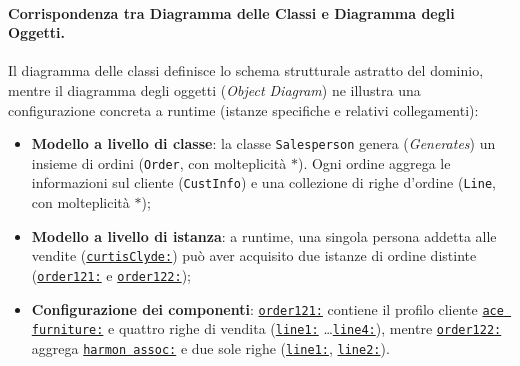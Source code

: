 \documentclass[12pt]{extarticle}
\begin{document}
\paragraph{Corrispondenza tra Diagramma delle Classi e Diagramma degli Oggetti.}
Il diagramma delle classi definisce lo schema strutturale astratto del dominio, mentre il diagramma degli oggetti (\textit{Object Diagram}) ne illustra una configurazione concreta a runtime (istanze specifiche e relativi collegamenti):
\begin{itemize}
    \item \textbf{Modello a livello di classe}: la classe \texttt{Salesperson} genera (\textit{Generates}) un insieme di ordini (\texttt{Order}, con molteplicità $*$). Ogni ordine aggrega le informazioni sul cliente (\texttt{CustInfo}) e una collezione di righe d'ordine (\texttt{Line}, con molteplicità $*$);
    \item \textbf{Modello a livello di istanza}: a runtime, una singola persona addetta alle vendite (\texttt{\underline{curtisClyde:}}) può aver acquisito due istanze di ordine distinte (\texttt{\underline{order121:}} e \texttt{\underline{order122:}});
    \item \textbf{Configurazione dei componenti}: \texttt{\underline{order121:}} contiene il profilo cliente \texttt{\underline{ace furniture:}} e quattro righe di vendita (\texttt{\underline{line1:}} \dots \texttt{\underline{line4:}}), mentre \texttt{\underline{order122:}} aggrega \texttt{\underline{harmon assoc:}} e due sole righe (\texttt{\underline{line1:}}, \texttt{\underline{line2:}}).
\end{itemize}
\end{document}
